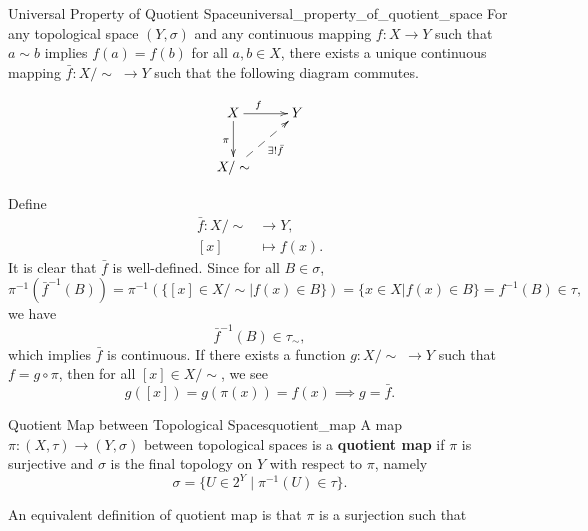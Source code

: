 \documentclass{report}
\begin{document}
\begin{proposition}{Universal Property of Quotient Space}{universal_property_of_quotient_space}
	For any topological space $(Y,\sigma)$ and any continuous mapping $f:X\to Y$ such that $a\sim b$ implies $f(a) = f(b)$ for all $a,b \in X$, there exists a unique continuous mapping $\bar{f}:X/\sim\;\to Y$ such that the following diagram commutes.

	\[\xymatrix{
		X\ar[r]^{f\quad}\ar[d]_{\pi}  &Y\\
		X/\sim\ar@{-->}[ru]_{\exists!\bar{f}}&
		}\]
\end{proposition}



\begin{prf}
	Define
	\begin{align*}
		\bar{f}:X/\sim & \longrightarrow Y, \\
		[x]            & \longmapsto f(x).
	\end{align*}
	It is clear that $\bar{f}$ is well-defined. Since for all $B\in \sigma$,
	\[
		\pi^{-1}\left(\bar{f}^{-1}(B)\right)=\pi^{-1}\left(\{[x]\in X/\sim| f(x)\in B\}\right)=\{x\in X| f(x)\in B\}=f^{-1}(B)\in \tau,
	\]
	we have
	\[
		\bar{f}^{-1}(B)\in \tau_\sim,
	\]
	which implies $\bar{f}$ is continuous. If there exists a function $g:X/\sim\;\to Y$ such that $f=g\circ\pi$, then for all $[x]\in X/\sim$, we see
	\[
		g([x])=g(\pi(x))=f(x)\implies g=\bar{f}.
	\]
\end{prf}

\begin{definition}{Quotient Map between Topological Spaces}{quotient_map}
	A map $\pi:(X,\tau)\to (Y,\sigma)$ between topological spaces is a \textbf{quotient map} if $\pi$ is surjective and $\sigma$ is the final topology on $Y$ with respect to $\pi$, namely
	\[
	\sigma=\{U\in 2^Y\mid \pi^{-1}(U)\in \tau\}.
	\]
\end{definition}
\begin{remark}
	An equivalent definition of quotient map is that $\pi$ is a surjection such that 
\end{remark}
\end{document}
